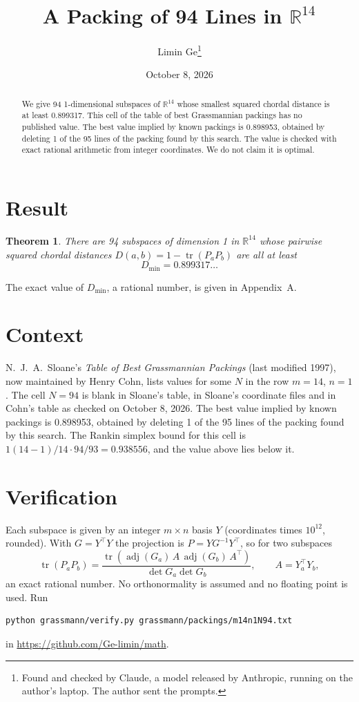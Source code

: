 \documentclass[11pt,a4paper]{article}
\title{A Packing of 94 Lines in $\mathbb{R}^{14}$}
\author{Limin Ge\thanks{Found and checked by Claude, a model released by Anthropic, running on the author's laptop. The author sent the prompts.}}
\date{October 8, 2026}
\newtheorem*{theorem}{Theorem}
\begin{document}
\maketitle
\begin{abstract}
We give 94 1-dimensional subspaces of $\mathbb{R}^{14}$ whose smallest squared chordal distance is at least 0.899317. This cell of the table of best Grassmannian packings has no published value. The best value implied by known packings is 0.898953, obtained by deleting 1 of the 95 lines of the packing found by this search. The value is checked with exact rational arithmetic from integer coordinates. We do not claim it is optimal.
\end{abstract}

\section{Result}
\begin{theorem}
There are 94 subspaces of dimension 1 in $\mathbb{R}^{14}$ whose pairwise squared chordal distances $D(a,b) = 1 - \operatorname{tr}(P_aP_b)$ are all at least
\[ D_{\min} = 0.899317\ldots \]
\end{theorem}
The exact value of $D_{\min}$, a rational number, is given in Appendix~A.


\section{Context}
N.~J.~A.~Sloane's \emph{Table of Best Grassmannian Packings} (last modified 1997), now maintained by Henry Cohn, lists values for some $N$ in the row $m=14$, $n=1$. The cell $N=94$ is blank in Sloane's table, in Sloane's coordinate files and in Cohn's table as checked on October 8, 2026. The best value implied by known packings is 0.898953, obtained by deleting 1 of the 95 lines of the packing found by this search. The Rankin simplex bound for this cell is $1(14-1)/14\cdot 94/93 = 0.938556$, and the value above lies below it.


\section{Verification}
Each subspace is given by an integer $m\times n$ basis $Y$ (coordinates times $10^{12}$, rounded). With $G=Y^\top Y$ the projection is $P=YG^{-1}Y^\top$, so for two subspaces
\[ \operatorname{tr}(P_aP_b)=\frac{\operatorname{tr}(\operatorname{adj}(G_a)\,A\,\operatorname{adj}(G_b)\,A^\top)}{\det G_a\det G_b},\qquad A=Y_a^\top Y_b, \]
an exact rational number. No orthonormality is assumed and no floating point is used. Run
\begin{verbatim}
python grassmann/verify.py grassmann/packings/m14n1N94.txt
\end{verbatim}
in \url{https://github.com/Ge-limin/math}.
\end{document}
